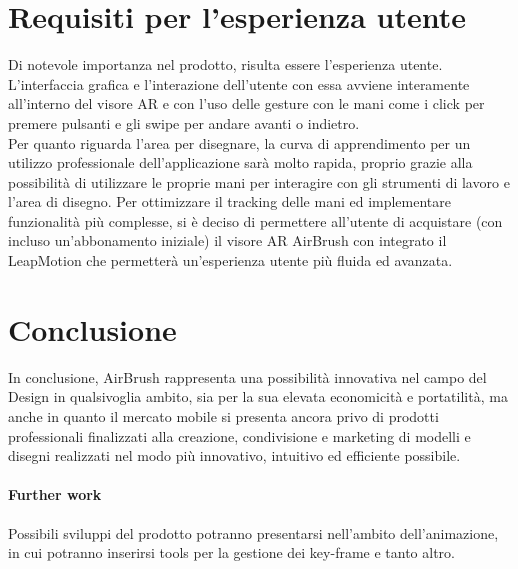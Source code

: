 \documentclass[11pt,fleqn]{book} %
\begin{document}
\section{Requisiti per l'esperienza utente}
Di notevole importanza nel prodotto, risulta essere l'esperienza utente. \\L'interfaccia grafica e l'interazione dell'utente con essa avviene interamente all'interno del visore AR e con l'uso delle gesture con le mani come i click per premere pulsanti e gli swipe per andare avanti o indietro.\\
Per quanto riguarda l'area per disegnare, la curva di apprendimento per un utilizzo professionale dell'applicazione sarà molto rapida, proprio grazie alla possibilità di utilizzare le proprie mani per interagire con gli strumenti di lavoro e l'area di disegno. Per ottimizzare il tracking delle mani ed implementare funzionalità più complesse, si è deciso di permettere all'utente di acquistare (con incluso un'abbonamento iniziale) il visore AR AirBrush con integrato il LeapMotion che permetterà un'esperienza utente più fluida ed avanzata.\\


\section{Conclusione}
In conclusione, AirBrush rappresenta una possibilità innovativa nel campo del Design in qualsivoglia ambito, sia per la sua elevata economicità e portatilità, ma anche in quanto il mercato mobile si presenta ancora privo di prodotti professionali finalizzati alla creazione, condivisione e marketing di modelli e disegni realizzati nel modo più innovativo, intuitivo ed efficiente possibile.
\paragraph{Further work}
Possibili sviluppi del prodotto potranno presentarsi nell'ambito dell'animazione, in cui potranno inserirsi tools per la gestione dei key-frame e tanto altro.
\end{document}
